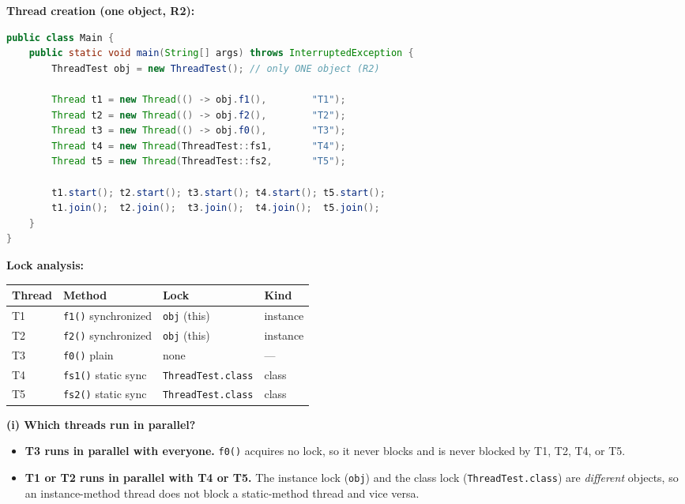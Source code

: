 \documentclass[12pt,a3paper]{article}
\begin{document}
\begin{enumerate}
\begin{tcolorbox}
\textbf{Thread creation (one object, R2):}

\begin{lstlisting}[language=Java]
public class Main {
    public static void main(String[] args) throws InterruptedException {
        ThreadTest obj = new ThreadTest(); // only ONE object (R2)

        Thread t1 = new Thread(() -> obj.f1(),        "T1");
        Thread t2 = new Thread(() -> obj.f2(),        "T2");
        Thread t3 = new Thread(() -> obj.f0(),        "T3");
        Thread t4 = new Thread(ThreadTest::fs1,       "T4");
        Thread t5 = new Thread(ThreadTest::fs2,       "T5");

        t1.start(); t2.start(); t3.start(); t4.start(); t5.start();
        t1.join();  t2.join();  t3.join();  t4.join();  t5.join();
    }
}
\end{lstlisting}

\medskip
\textbf{Lock analysis:}

\begin{center}
\small
\begin{tabular}{@{}llll@{}}
\toprule
\textbf{Thread} & \textbf{Method} & \textbf{Lock} & \textbf{Kind} \\
\midrule
T1 & \texttt{f1()} synchronized & \texttt{obj} (this) & instance \\
T2 & \texttt{f2()} synchronized & \texttt{obj} (this) & instance \\
T3 & \texttt{f0()} plain         & none               & --- \\
T4 & \texttt{fs1()} static sync  & \texttt{ThreadTest.class} & class \\
T5 & \texttt{fs2()} static sync  & \texttt{ThreadTest.class} & class \\
\bottomrule
\end{tabular}
\end{center}

\medskip
\textbf{(i) Which threads run in parallel?}
\begin{itemize}[itemsep=2pt]
  \item \textbf{T3 runs in parallel with everyone.}
    \texttt{f0()} acquires no lock, so it never blocks and is never
    blocked by T1, T2, T4, or T5.
  \item \textbf{T1 or T2 runs in parallel with T4 or T5.}
    The instance lock (\texttt{obj}) and the class lock
    (\texttt{ThreadTest.class}) are \emph{different} objects, so
    an instance-method thread does not block a static-method thread
    and vice versa.
\end{itemize}


\end{tcolorbox}
\end{enumerate}
\end{document}
